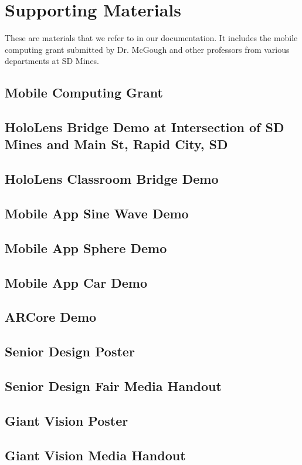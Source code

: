 \chapter{Supporting Materials}
\label{ch:support}

These are materials that we refer to in our documentation. It includes the 
mobile computing grant submitted by Dr. McGough and other professors from 
various departments at SD Mines.


\section{Mobile Computing Grant}


\section{HoloLens Bridge Demo at Intersection of SD Mines and Main St, Rapid City, SD}


\section{HoloLens Classroom Bridge Demo}

\section{Mobile App Sine Wave Demo}


\section{Mobile App Sphere Demo}


\section{Mobile App Car Demo}


\section{ARCore Demo}


\section{Senior Design Poster}


\section{Senior Design Fair Media Handout}


\section{Giant Vision Poster}


\section{Giant Vision Media Handout}
 